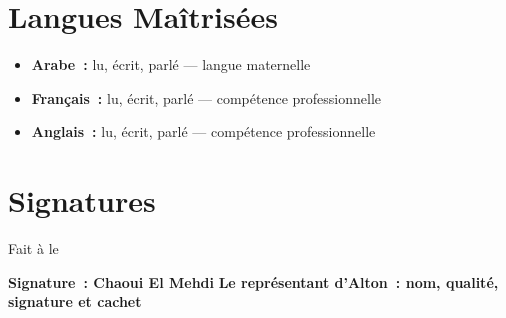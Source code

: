 \section*{Langues Maîtrisées}

\begin{itemize}
    \item \textbf{Arabe~:} lu, écrit, parlé --- langue maternelle
    \item \textbf{Français~:} lu, écrit, parlé --- compétence professionnelle
    \item \textbf{Anglais~:} lu, écrit, parlé --- compétence professionnelle
\end{itemize}

\needspace{6cm}
\section*{Signatures}

\noindent Fait à \makebox[4cm]{\dotfill} le \makebox[3cm]{\dotfill}

\vspace{6pt}
\noindent\textbf{Signature~: Chaoui El Mehdi} \hfill \textbf{Le représentant d'Alton~: nom, qualité, signature et cachet}

\vspace{2cm}\mbox{}
